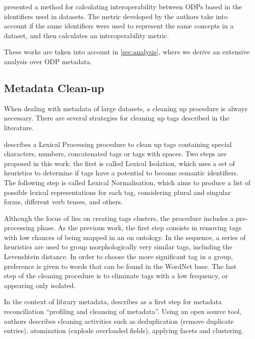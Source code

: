  presented a method for calculating interoperability between ODPs based in the identifiers used in datasets.
The metric developed by the authors take into account if the same identifiers were used to represent the same concepts in a dataset, and then calculates an interoperability metric.

These works are taken into account in \autoref{sec:analysis}, where we derive an extensive analysis over ODP metadata.

\subsection{Metadata Clean-up}
\label{sec:metadata_cleanup}

When dealing with metadata of large datasets, a cleaning up procedure is always necessary.
There are several strategies for cleaning up tags described in the literature.

 describes a Lexical Processing procedure to clean up tags containing special characters, numbers, concatenated tags or tags with spaces.
Two steps are proposed in this work: the first is called Lexical Isolation, which uses a set of heuristics to determine if tags have a potential to become semantic identifiers.
The following step is called Lexical Normalisation, which aims to produce a list of possible lexical representations for each tag, considering plural and singular forms, different verb tenses, and others.

Although the focus of  lies on creating tags clusters, the procedure includes a pre-processing phase.
As the previous work, the first step consists in removing tags with low chances of being mapped in an on ontology.
In the sequence, a series of heuristics are used to group morphologically very similar tags, including the Levenshtein distance.
In order to choose the more significant tag in a group, preference is given to words that can be found in the WordNet base.
The last step of the cleaning procedure is to eliminate tags with a low frequency, or appearing only isolated.

In the context of library metadata,  describes as a first step for metadata reconciliation ``profiling and cleansing of metadata''.
Using an open source tool, authors describes cleaning activities such as deduplication (remove duplicate entries), atomization (explode overloaded fields), applying facets and clustering.


